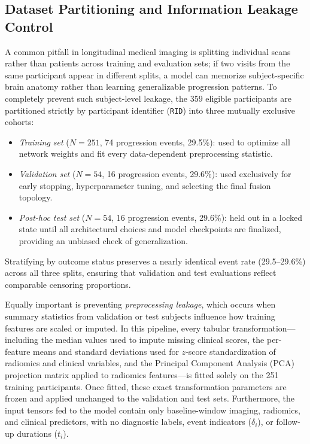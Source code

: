 \subsection{Dataset Partitioning and Information Leakage Control}
\label{sec:data-split}
A common pitfall in longitudinal medical imaging is splitting individual scans rather than patients across training and evaluation sets; if two visits from the same participant appear in different splits, a model can memorize subject-specific brain anatomy rather than learning generalizable progression patterns. To completely prevent such subject-level leakage, the 359 eligible participants are partitioned strictly by participant identifier (\texttt{RID}) into three mutually exclusive cohorts:
\begin{itemize}[itemsep=0.2em,topsep=0.25em]
\item \emph{Training set} ($N=251$, 74 progression events, 29.5\%): used to optimize all network weights and fit every data-dependent preprocessing statistic.
\item \emph{Validation set} ($N=54$, 16 progression events, 29.6\%): used exclusively for early stopping, hyperparameter tuning, and selecting the final fusion topology.
\item \emph{Post-hoc test set} ($N=54$, 16 progression events, 29.6\%): held out in a locked state until all architectural choices and model checkpoints are finalized, providing an unbiased check of generalization.
\end{itemize}
Stratifying by outcome status preserves a nearly identical event rate (29.5--29.6\%) across all three splits, ensuring that validation and test evaluations reflect comparable censoring proportions.

Equally important is preventing \emph{preprocessing leakage}, which occurs when summary statistics from validation or test subjects influence how training features are scaled or imputed. In this pipeline, every tabular transformation---including the median values used to impute missing clinical scores, the per-feature means and standard deviations used for $z$-score standardization of radiomics and clinical variables, and the Principal Component Analysis (PCA) projection matrix applied to radiomics features---is fitted solely on the 251 training participants. Once fitted, these exact transformation parameters are frozen and applied unchanged to the validation and test sets. Furthermore, the input tensors fed to the model contain only baseline-window imaging, radiomics, and clinical predictors, with no diagnostic labels, event indicators ($\delta_i$), or follow-up durations ($t_i$).

